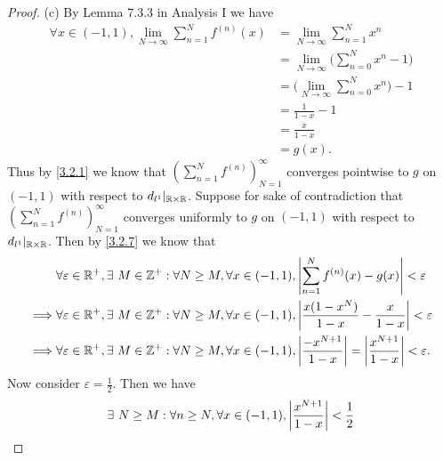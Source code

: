 \begin{proof}{(c)}
  By Lemma 7.3.3 in Analysis I we have
  \begin{align*}
    \forall x \in (-1, 1), \lim_{N \to \infty} \sum_{n = 1}^N f^{(n)}(x) & = \lim_{N \to \infty} \sum_{n = 1}^N x^n                 \\
                                                                         & = \lim_{N \to \infty} \bigg(\sum_{n = 0}^N x^n - 1\bigg) \\
                                                                         & = \bigg(\lim_{N \to \infty} \sum_{n = 0}^N x^n\bigg) - 1 \\
                                                                         & = \frac{1}{1 - x} - 1                                    \\
                                                                         & = \frac{x}{1 - x}                                        \\
                                                                         & = g(x).
  \end{align*}
  Thus by \cref{3.2.1} we know that \((\sum_{n = 1}^N f^{(n)})_{N = 1}^\infty\) converges pointwise to \(g\) on \((-1, 1)\) with respect to \(d_{l^1}|_{\mathbb{R} \times \mathbb{R}}\).
  Suppose for sake of contradiction that \((\sum_{n = 1}^N f^{(n)})_{N = 1}^\infty\) converges uniformly to \(g\) on \((-1, 1)\) with respect to \(d_{l^1}|_{\mathbb{R} \times \mathbb{R}}\).
  Then by \cref{3.2.7} we know that
  \begin{align*}
             & \forall \varepsilon \in \mathbb{R}^+, \exists\ M \in \mathbb{Z}^+ : \forall N \geq M, \forall x \in (-1, 1), \left\lvert\sum_{n = 1}^N f^{(n)}(x) - g(x)\right\rvert < \varepsilon                          \\
    \implies & \forall \varepsilon \in \mathbb{R}^+, \exists\ M \in \mathbb{Z}^+ : \forall N \geq M, \forall x \in (-1, 1), \left\lvert\frac{x(1 - x^N)}{1 - x} - \frac{x}{1 - x}\right\rvert < \varepsilon                \\
    \implies & \forall \varepsilon \in \mathbb{R}^+, \exists\ M \in \mathbb{Z}^+ : \forall N \geq M, \forall x \in (-1, 1), \left\lvert\frac{-x^{N + 1}}{1 - x}\right\rvert = \left\lvert\frac{x^{N + 1}}{1 - x}\right\rvert < \varepsilon.
  \end{align*}
  Now consider \(\varepsilon = \frac{1}{2}\).
  Then we have
  \begin{align*}
             & \exists\ N \geq M : \forall n \geq N, \forall x \in (-1, 1), \abs{\frac{x^{N + 1}}{1 - x}} < \frac{1}{2}                                                               \\

\end{align*}
\end{proof}
